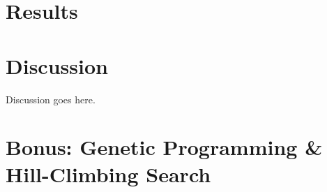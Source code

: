 \documentclass{article}
\begin{document}
\section{Results}
  
  
  
  

\clearpage
\section{Discussion}
  Discussion goes here.


\clearpage
\section{Bonus: Genetic Programming \& Hill-Climbing Search}
  
\end{document}
